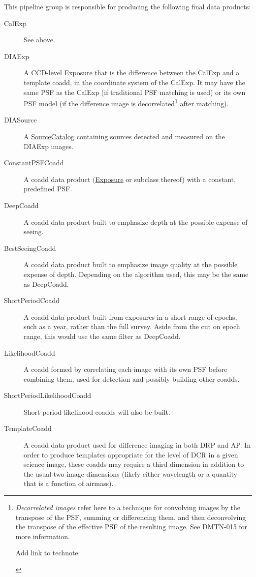 This pipeline group is responsible for producing the following final data products:
\begin{description}
\item[CalExp]  See above.
\item[DIAExp] A CCD-level \hyperref[sec:spImagesExposure]{Exposure} that is the difference between the CalExp and a template coadd, in the coordinate system of the CalExp.  It may have the same PSF as the CalExp (if traditional PSF matching is used) or its own PSF model (if the difference image is decorrelated\footnote{\textit{Decorrelated images} refer here to a technique for convolving images by the transpose of the PSF, summing or differencing them, and then deconvolving the transpose of the effective PSF of the resulting image.  See DMTN-015 for more information.
\begin{note}
Add link to technote.
\end{note}} after matching).
\item[DIASource] A \hyperref[sec:spTablesSource]{SourceCatalog} containing sources detected and measured on the DIAExp images.
\item[ConstantPSFCoadd] A coadd data product (\hyperref[sec:spImagesExposure]{Exposure} or subclass thereof) with a constant, predefined PSF.
\item[DeepCoadd] A coadd data product built to emphasize depth at the possible expense of seeing.
\item[BestSeeingCoadd] A coadd data product built to emphasize image quality at the possible expense of depth.  Depending on the algorithm used, this may be the same as DeepCoadd.
\item[ShortPeriodCoadd] A coadd data product built from exposures in a short range of epochs, such as a year, rather than the full survey.  Aside from the cut on epoch range, this would use the same filter as DeepCoadd.
\item[LikelihoodCoadd] A coadd formed by correlating each image with its own PSF before combining them, used for detection and possibly building other coadds.
\item[ShortPeriodLikelihoodCoadd] Short-period likelihood coadds will also be built.
\item[TemplateCoadd] A coadd data product used for difference imaging in both DRP and AP.  In order to produce templates appropriate for the level of DCR in a given science image, these coadds may require a third dimension in addition to the usual two image dimensions (likely either wavelength or a quantity that is a function of airmass).
\end{description}

